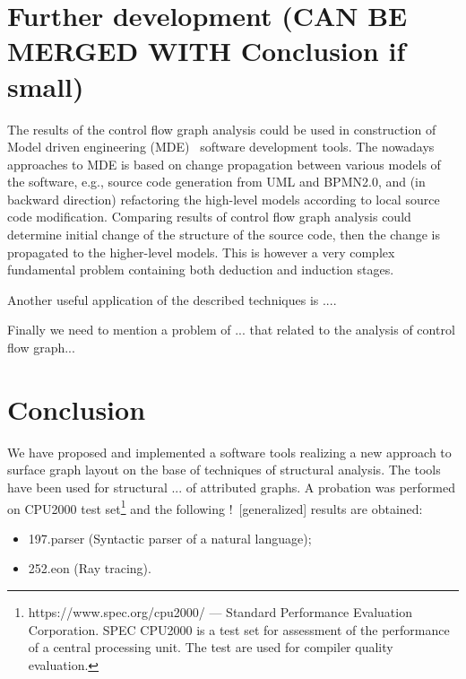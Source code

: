 \documentclass[conference]{IEEEtran}
\newcommand{\nnn}[2][ncolor]{\noindent%
\textcolor{eclr}{!\ [}\textcolor{#1}{#2}\textcolor{eclr}{]}}
\begin{document}

\section{Further development (CAN BE MERGED WITH Conclusion if small)}
\label{sec:further-development}

The results of the control flow graph analysis could be used in construction of Model driven engineering (MDE)~\cite{book,eugeneai} software development tools.  The nowadays approaches to MDE is based on change propagation between various models of the software, e.g., source code generation from UML and BPMN2.0, and (in backward direction) refactoring the high-level models according to local source code modification.  Comparing results of control flow graph analysis could determine initial change of the structure of the source code, then the change is propagated to the higher-level models.  This is however a very complex fundamental problem containing both deduction and induction stages.

Another useful application of the described techniques is ....

Finally we need to mention a problem of ... that related to the analysis of control flow graph...


\section{Conclusion}
We have proposed and implemented a software tools realizing a new approach to surface graph layout on the base of techniques of structural analysis.  The tools have been used for structural ... of attributed graphs.  A probation was performed on CPU2000 test set\footnote{https://www.spec.org/cpu2000/ --- Standard Performance Evaluation Corporation.  SPEC CPU2000 is a test set for assessment of the performance of a central processing unit. The test are used for compiler quality evaluation.} and the following \nnn{generalized} results are obtained:
\begin{itemize}
\item 197.parser (Syntactic parser of a natural language);
\item 252.eon (Ray tracing).
\end{itemize}
\end{document}
